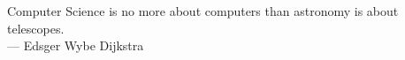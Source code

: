 
\cleardoublepage
{}
\thispagestyle{empty}

\vspace*{3cm}

\begin{center}
Computer Science is no more about computers than astronomy is about telescopes. \\ \medskip
--- Edsger Wybe Dijkstra
\end{center}

\medskip

